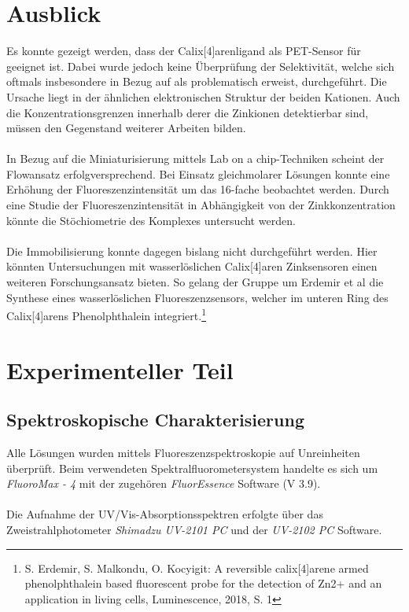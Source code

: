 \documentclass[12pt,a4paper]{report}
\begin{document}
	\chapter{Ausblick}
	\noindent Es konnte gezeigt werden, dass der Calix[4]arenligand als PET-Sensor für  geeignet ist. Dabei wurde jedoch keine Überprüfung der Selektivität, welche sich oftmals insbesondere in Bezug auf  als problematisch erweist, durchgeführt. Die Ursache liegt in der ähnlichen elektronischen Struktur der beiden Kationen. Auch die Konzentrationsgrenzen innerhalb derer die Zinkionen detektierbar sind, müssen den Gegenstand weiterer Arbeiten bilden.\\
	\ \\
	In Bezug auf die Miniaturisierung mittels Lab on a chip-Techniken scheint der Flowansatz erfolgversprechend. Bei Einsatz gleichmolarer Lösungen konnte eine Erhöhung der Fluoreszenzintensität um das 16-fache beobachtet werden. Durch eine Studie der Fluoreszenzintensität in Abhängigkeit von der Zinkkonzentration könnte die Stöchiometrie des Komplexes untersucht werden. \\
	\ \\
	Die Immobilisierung konnte dagegen bislang nicht durchgeführt werden. Hier könnten Untersuchungen mit wasserlöslichen Calix[4]aren Zinksensoren einen weiteren Forschungsansatz bieten. So gelang der Gruppe um Erdemir et al die Synthese eines wasserlöslichen Fluoreszenzsensors, welcher im unteren Ring des Calix[4]arens Phenolphthalein integriert.\footnote{S. Erdemir, S. Malkondu, O. Kocyigit: A reversible calix[4]arene armed phenolphthalein based fluorescent probe for the detection of Zn2+ and an application in living cells, Luminescence, 2018, S. 1}
	\chapter{Experimenteller Teil}
	\section{Spektroskopische Charakterisierung}
	Alle Lösungen wurden mittels Fluoreszenzspektroskopie auf Unreinheiten überprüft. Beim verwendeten Spektralfluorometersystem handelte es sich um \textit{FluoroMax - 4} mit der zugehören\textit{ FluorEssence} Software (V 3.9). \\
	\ \\
	Die Aufnahme der UV/Vis-Absorptionsspektren erfolgte über das Zweistrahlphotometer \textit{Shimadzu UV-2101 PC} und der \textit{UV-2102 PC} Software.
\end{document}
